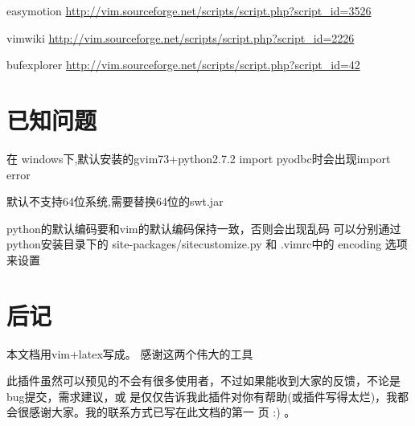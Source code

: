 \documentclass[oneside,openany]{book}
\begin{document}
  easymotion
  \href{http://vim.sourceforge.net/scripts/script.php?script\_id=3526}
   {http://vim.sourceforge.net/scripts/script.php?script\_id=3526}

  vimwiki
  \href{http://vim.sourceforge.net/scripts/script.php?script\_id=2226}
   {http://vim.sourceforge.net/scripts/script.php?script\_id=2226}


  bufexplorer
  \href{http://vim.sourceforge.net/scripts/script.php?script\_id=42}
   {http://vim.sourceforge.net/scripts/script.php?script\_id=42}

\chapter{已知问题}


    在 windows下,默认安装的gvim73+python2.7.2 import pyodbc时会出现import error 

    默认不支持64位系统,需要替换64位的swt.jar 

    python的默认编码要和vim的默认编码保持一致，否则会出现乱码 可以分别通过 python安装目录下的
    site-packages/sitecustomize.py 和 .vimrc中的 encoding 选项来设置 

\chapter{后记}
   本文档用vim+latex写成。 感谢这两个伟大的工具

   此插件虽然可以预见的不会有很多使用者，不过如果能收到大家的反馈，不论是bug提交，需求建议，或
是仅仅告诉我此插件对你有帮助(或插件写得太烂)，我都会很感谢大家。我的联系方式已写在此文档的第一
页 :) 。

   
\end{document}
